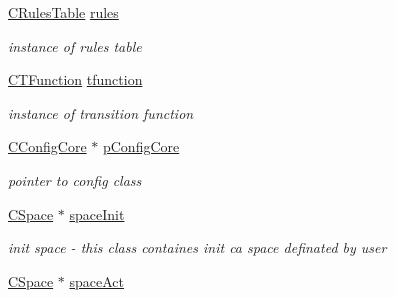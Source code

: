 \begin{DoxyCompactItemize}
\item 
\hypertarget{classCCellularAutomata_a856d50a387aaa5b24b0f982c59704534}{
\hyperlink{classCRulesTable}{CRulesTable} \hyperlink{classCCellularAutomata_a856d50a387aaa5b24b0f982c59704534}{rules}}
\label{classCCellularAutomata_a856d50a387aaa5b24b0f982c59704534}

\begin{DoxyCompactList}\small\item\em instance of rules table \item\end{DoxyCompactList}\item 
\hypertarget{classCCellularAutomata_ae38dbd5f4ff0a7ccef1befc45a8fc8d2}{
\hyperlink{classCTFunction}{CTFunction} \hyperlink{classCCellularAutomata_ae38dbd5f4ff0a7ccef1befc45a8fc8d2}{tfunction}}
\label{classCCellularAutomata_ae38dbd5f4ff0a7ccef1befc45a8fc8d2}

\begin{DoxyCompactList}\small\item\em instance of transition function \item\end{DoxyCompactList}\item 
\hypertarget{classCCellularAutomata_ac5ad3726d78ae250825ae79eb6c226fc}{
\hyperlink{classCConfigCore}{CConfigCore} $\ast$ \hyperlink{classCCellularAutomata_ac5ad3726d78ae250825ae79eb6c226fc}{pConfigCore}}
\label{classCCellularAutomata_ac5ad3726d78ae250825ae79eb6c226fc}

\begin{DoxyCompactList}\small\item\em pointer to config class \item\end{DoxyCompactList}\item 
\hypertarget{classCCellularAutomata_abe77b69b74343937505dfc8baf7573f4}{
\hyperlink{classCSpace}{CSpace} $\ast$ \hyperlink{classCCellularAutomata_abe77b69b74343937505dfc8baf7573f4}{spaceInit}}
\label{classCCellularAutomata_abe77b69b74343937505dfc8baf7573f4}

\begin{DoxyCompactList}\small\item\em init space -\/ this class containes init ca space definated by user \item\end{DoxyCompactList}\item 
\hypertarget{classCCellularAutomata_a8d83846d9887075192d5f1d78a55e6d5}{
\hyperlink{classCSpace}{CSpace} $\ast$ \hyperlink{classCCellularAutomata_a8d83846d9887075192d5f1d78a55e6d5}{spaceAct}}
\label{classCCellularAutomata_a8d83846d9887075192d5f1d78a55e6d5}


\end{DoxyCompactItemize}

